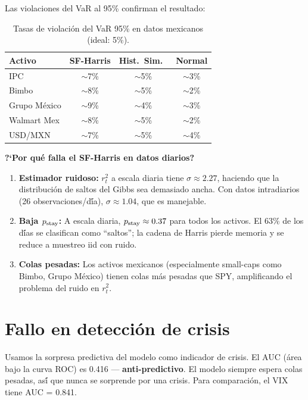 Las violaciones del VaR al 95\% confirman el resultado:

\begin{table}[h]
\centering
\caption{Tasas de violaci\'{o}n del VaR 95\% en datos mexicanos (ideal: 5\%).}
\label{tab:mexican-var}
\begin{tabular}{lccc}
\toprule
Activo & SF-Harris & Hist.\ Sim.\ & Normal \\
\midrule
IPC & $\sim$7\% & $\sim$5\% & $\sim$3\% \\
Bimbo & $\sim$8\% & $\sim$5\% & $\sim$2\% \\
Grupo M\'{e}xico & $\sim$9\% & $\sim$4\% & $\sim$3\% \\
Walmart Mex & $\sim$8\% & $\sim$5\% & $\sim$2\% \\
USD/MXN & $\sim$7\% & $\sim$5\% & $\sim$4\% \\
\bottomrule
\end{tabular}
\end{table}

\textbf{?`Por qu\'{e} falla el SF-Harris en datos diarios?}
\begin{enumerate}
    \item \textbf{Estimador ruidoso:} $r_t^2$ a escala diaria tiene
    $\sigma \approx 2.27$, haciendo que la distribuci\'{o}n de saltos del Gibbs
    sea demasiado ancha. Con datos intradiarios (26 observaciones/d\'{\'i}a),
    $\sigma \approx 1.04$, que es manejable.
    \item \textbf{Baja $p_{\text{stay}}$:} A escala diaria, $p_{\text{stay}} \approx 0.37$ para
    todos los activos. El 63\% de los d\'{\'i}as se clasifican como ``saltos'';
    la cadena de Harris pierde memoria y se reduce a muestreo iid con ruido.
    \item \textbf{Colas pesadas:} Los activos mexicanos (especialmente small-caps
    como Bimbo, Grupo M\'{e}xico) tienen colas m\'{a}s pesadas que SPY,
    amplificando el problema del ruido en $r_t^2$.
\end{enumerate}

\section{Fallo en detecci\'{o}n de crisis}

Usamos la sorpresa predictiva del modelo como indicador de crisis.
El AUC (\'{a}rea bajo la curva ROC) es 0.416 --- \textbf{anti-predictivo}.
El modelo siempre espera colas pesadas, as\'{\'i} que nunca se sorprende
por una crisis. Para comparaci\'{o}n, el VIX tiene AUC = 0.841.

